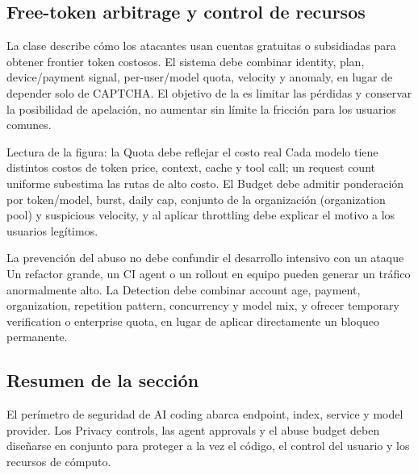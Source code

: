 \subsection{Free-token arbitrage y control de recursos}

La clase describe cómo los atacantes usan cuentas gratuitas o subsidiadas para obtener frontier token costosos. El sistema debe combinar identity, plan, device/payment signal, per-user/model quota, velocity y anomaly, en lugar de depender solo de CAPTCHA. El objetivo de la  es limitar las pérdidas y conservar la posibilidad de apelación, no aumentar sin límite la fricción para los usuarios comunes.


\begin{knowledgebox}{Lectura de la figura: la Quota debe reflejar el costo real}
Cada modelo tiene distintos costos de token price, context, cache y tool call; un request count uniforme subestima las rutas de alto costo. El Budget debe admitir ponderación por token/model, burst, daily cap, conjunto de la organización (organization pool) y suspicious velocity, y al aplicar throttling debe explicar el motivo a los usuarios legítimos.
\end{knowledgebox}

\begin{warningbox}{La prevención del abuso no debe confundir el desarrollo intensivo con un ataque}
Un refactor grande, un CI agent o un rollout en equipo pueden generar un tráfico anormalmente alto. La Detection debe combinar account age, payment, organization, repetition pattern, concurrency y model mix, y ofrecer temporary verification o enterprise quota, en lugar de aplicar directamente un bloqueo permanente.
\end{warningbox}


\subsection{Resumen de la sección}

El perímetro de seguridad de AI coding abarca endpoint, index, service y model provider. Los Privacy controls, las agent approvals y el abuse budget deben diseñarse en conjunto para proteger a la vez el código, el control del usuario y los recursos de cómputo.
